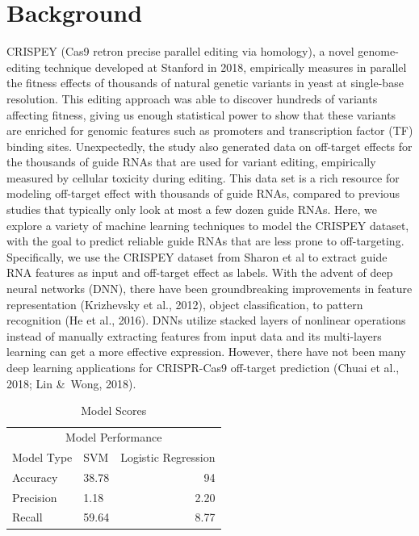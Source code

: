 \documentclass[10pt,twocolumn,letterpaper]{article}
\begin{document}
\section*{Background}
CRISPEY (Cas9 retron precise parallel editing via homology), a novel genome-editing technique developed at Stanford in 2018, empirically measures in parallel the fitness effects of thousands of natural genetic variants in yeast at single-base resolution. This editing approach was able to discover hundreds of variants affecting fitness, giving us enough statistical power to show that these variants are enriched for genomic features such as promoters and transcription factor (TF) binding sites. Unexpectedly, the study also generated data on off-target effects for the thousands of guide RNAs that are used for variant editing, empirically measured by cellular toxicity during editing. This data set is a rich resource for modeling off-target effect with thousands of guide RNAs, compared to previous studies that typically only look at most a few dozen guide RNAs. Here, we explore a variety of machine learning techniques to model the CRISPEY dataset, with the goal to predict reliable guide RNAs that are less prone to off-targeting. Specifically, we use the CRISPEY dataset from Sharon et al to extract guide RNA features as input and off-target effect as labels.
With the advent of deep neural networks (DNN), there have been groundbreaking improvements in feature representation (Krizhevsky et al., 2012), object classification, to pattern recognition (He et al., 2016). DNNs utilize stacked layers of nonlinear operations instead of manually extracting features from input data and its multi-layers learning can get a more effective expression. However, there have not been many deep learning applications for CRISPR-Cas9 off-target prediction (Chuai et al., 2018; Lin \&\ Wong, 2018). 
\begin{table}[]
	\begin{tabular}{llr}
		\hline
		\multicolumn{3}{c}{Model Performance}    \\ \cline{1-3}
		Model Type & SVM   & Logistic Regression \\ \hline
		Accuracy   & 38.78 &         94            \\
		Precision  & 1.18  &          2.20           \\
		Recall     & 59.64 &                 8.77    \\
	\end{tabular}
	\caption{\label{tab: Model Scores}Model Scores}
\end{table}
\end{document}
